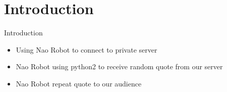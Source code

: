 \section{Introduction}
    
    \frame{\sectionpage}
    
    \begin{frame}{Introduction}
		\begin{itemize}
			\item Using Nao Robot to connect to private server
			\pause
			\item Nao Robot using python2 to receive random quote from our server
			\pause
			\item Nao Robot repeat quote to our audience
		\end{itemize}
	\end{frame}